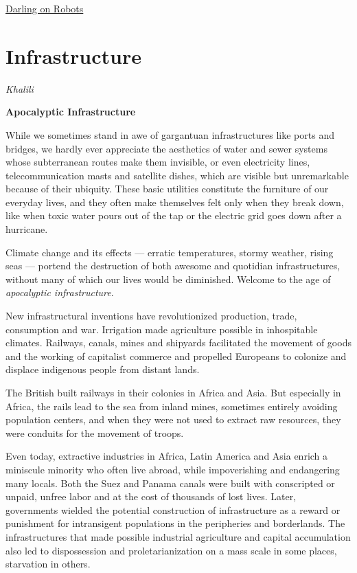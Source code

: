 \documentclass[
]{book}
\begin{document}
\href{https://www.theguardian.com/technology/2021/apr/17/ai-ethicist-kate-darling-robots-can-be-our-partners}{Darling on Robots}

\hypertarget{infrastructure}{%
\section{Infrastructure}\label{infrastructure}}

\emph{Khalili}

\textbf{Apocalyptic Infrastructure}

While we sometimes stand in awe of gargantuan infrastructures like ports and bridges, we hardly ever appreciate the aesthetics of water and sewer systems whose subterranean routes make them invisible, or even electricity lines, telecommunication masts and satellite dishes, which are visible but unremarkable because of their ubiquity. These basic utilities constitute the furniture of our everyday lives, and they often make themselves felt only when they break down, like when toxic water pours out of the tap or the electric grid goes down after a hurricane.

Climate change and its effects --- erratic temperatures, stormy weather, rising seas --- portend the destruction of both awesome and quotidian infrastructures, without many of which our lives would be diminished. Welcome to the age of \emph{apocalyptic infrastructure}.

New infrastructural inventions have revolutionized production, trade, consumption and war. Irrigation made agriculture possible in inhospitable climates. Railways, canals, mines and shipyards facilitated the movement of goods and the working of capitalist commerce and propelled Europeans to colonize and displace indigenous people from distant lands.

The British built railways in their colonies in Africa and Asia. But especially in Africa, the rails lead to the sea from inland mines, sometimes entirely avoiding population centers, and when they were not used to extract raw resources, they were conduits for the movement of troops.

Even today, extractive industries in Africa, Latin America and Asia enrich a miniscule minority who often live abroad, while impoverishing and endangering many locals. Both the Suez and Panama canals were built with conscripted or unpaid, unfree labor and at the cost of thousands of lost lives. Later, governments wielded the potential construction of infrastructure as a reward or punishment for intransigent populations in the peripheries and borderlands. The infrastructures that made possible industrial agriculture and capital accumulation also led to dispossession and proletarianization on a mass scale in some places, starvation in others.
\end{document}
